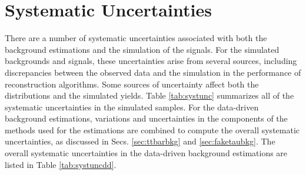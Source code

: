 \section{Systematic Uncertainties
\label{sec:systematics}}

There are a number of systematic uncertainties associated with both the background estimations and the simulation of the signals. For the simulated backgrounds and signals, these uncertainties arise from several sources, including discrepancies between the observed data and the simulation in the performance of reconstruction algorithms. Some sources of uncertainty affect both the \ST distributions and the simulated yields. Table \ref{tab:systunc} summarizes all of the systematic uncertainties in the simulated samples. For the data-driven background estimations, variations and uncertainties in the components of the methods used for the estimations are combined to compute the overall systematic uncertainties, as discussed in Secs. \ref{sec:ttbarbkg} and \ref{sec:faketaubkg}. The overall systematic uncertainties in the data-driven background estimations are listed in Table \ref{tab:systuncdd}.

